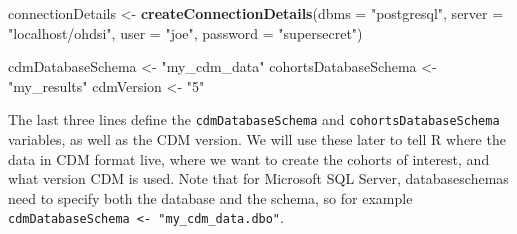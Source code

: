 \documentclass[
]{article}
\newenvironment{Shaded}{\begin{snugshade}}{\end{snugshade}}
\newcommand{\AttributeTok}[1]{\textcolor[rgb]{0.13,0.29,0.53}{#1}}
\newcommand{\FunctionTok}[1]{\textcolor[rgb]{0.13,0.29,0.53}{\textbf{#1}}}
\newcommand{\NormalTok}[1]{#1}
\newcommand{\OtherTok}[1]{\textcolor[rgb]{0.56,0.35,0.01}{#1}}
\newcommand{\SpecialCharTok}[1]{\textcolor[rgb]{0.81,0.36,0.00}{\textbf{#1}}}
\newcommand{\StringTok}[1]{\textcolor[rgb]{0.31,0.60,0.02}{#1}}
\begin{document}
\begin{Shaded}
\begin{Highlighting}[]
\NormalTok{    connectionDetails }\OtherTok{\textless{}{-}} \FunctionTok{createConnectionDetails}\NormalTok{(}\AttributeTok{dbms =} \StringTok{"postgresql"}\NormalTok{, }
                                                 \AttributeTok{server =} \StringTok{"localhost/ohdsi"}\NormalTok{, }
                                                 \AttributeTok{user =} \StringTok{"joe"}\NormalTok{, }
                                                 \AttributeTok{password =} \StringTok{"supersecret"}\NormalTok{)}
    
\NormalTok{    cdmDatabaseSchema }\OtherTok{\textless{}{-}} \StringTok{"my\_cdm\_data"}
\NormalTok{    cohortsDatabaseSchema }\OtherTok{\textless{}{-}} \StringTok{"my\_results"}
\NormalTok{    cdmVersion }\OtherTok{\textless{}{-}} \StringTok{"5"}
\end{Highlighting}
\end{Shaded}

The last three lines define the \texttt{cdmDatabaseSchema} and
\texttt{cohortsDatabaseSchema} variables, as well as the CDM version. We
will use these later to tell R where the data in CDM format live, where
we want to create the cohorts of interest, and what version CDM is used.
Note that for Microsoft SQL Server, databaseschemas need to specify both
the database and the schema, so for example
\texttt{cdmDatabaseSchema\ \textless{}-\ "my\_cdm\_data.dbo"}.

\begin{Shaded}
\end{Shaded}
\end{document}
